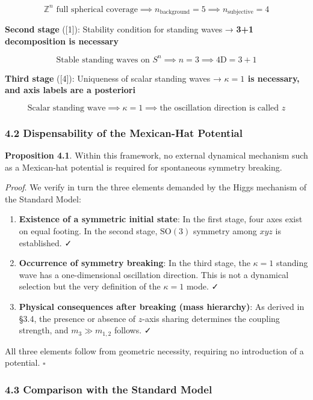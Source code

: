 \documentclass[
  a4paper,11pt]{article}
\begin{document}
\[\text{$\mathbb{Z}^n$ full spherical coverage} \implies n_{\text{background}} = 5 \implies n_{\text{subjective}} = 4\]

\textbf{Second stage} ({[}1{]}): Stability condition for standing waves
→ \textbf{3+1 decomposition is necessary}

\[\text{Stable standing waves on $S^n$} \implies n = 3 \implies 4\text{D} = 3 + 1\]

\textbf{Third stage} ({[}4{]}): Uniqueness of scalar standing waves →
\textbf{\(\kappa = 1\) is necessary, and axis labels are a posteriori}

\[\text{Scalar standing wave} \implies \kappa = 1 \implies \text{the oscillation direction is called $z$}\]

\subsubsection{4.2 Dispensability of the Mexican-Hat
Potential}\label{dispensability-of-the-mexican-hat-potential}

\textbf{Proposition 4.1}. Within this framework, no external dynamical
mechanism such as a Mexican-hat potential is required for spontaneous
symmetry breaking.

\emph{Proof}. We verify in turn the three elements demanded by the Higgs
mechanism of the Standard Model:

\begin{enumerate}
\def\labelenumi{(\roman{enumi})}
\item
  \textbf{Existence of a symmetric initial state}: In the first stage,
  four axes exist on equal footing. In the second stage,
  \(\mathrm{SO}(3)\) symmetry among \(xyz\) is established. ✓
\item
  \textbf{Occurrence of symmetry breaking}: In the third stage, the
  \(\kappa = 1\) standing wave has a one-dimensional oscillation
  direction. This is not a dynamical selection but the very definition
  of the \(\kappa = 1\) mode. ✓
\item
  \textbf{Physical consequences after breaking (mass hierarchy)}: As
  derived in §3.4, the presence or absence of \(z\)-axis sharing
  determines the coupling strength, and \(m_3 \gg m_{1,2}\) follows. ✓
\end{enumerate}

All three elements follow from geometric necessity, requiring no
introduction of a potential. \(\square\)

\subsubsection{4.3 Comparison with the Standard
Model}\label{comparison-with-the-standard-model}
\end{document}
